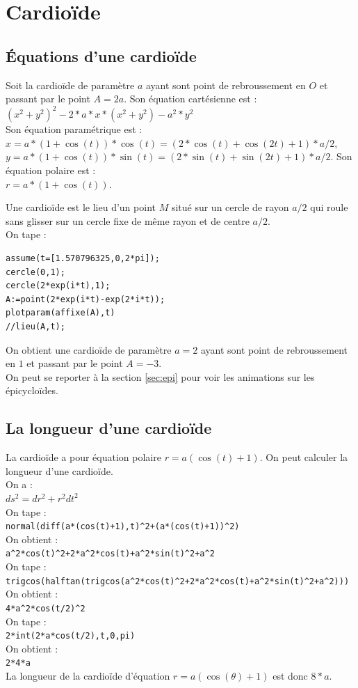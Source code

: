 \documentclass[a4paper,11pt]{book}
\begin{document}
\section{Cardio\"ide}
\subsection{\'Equations d'une cardio\"{i}de}
Soit la cardio\"ide de param\`etre $a$ ayant sont point de rebroussement en $O$ 
et passant par le point $A=2a$.
Son \'equation cart\'esienne est :\\
$(x^2+y^2)^2-2*a*x*(x^2+y^2)-a^2*y^2$\\
Son \'equation param\'etrique est :\\
$x=a*(1+\cos(t))*\cos(t)=(2*\cos(t)+\cos(2t)+1)*a/2$,\\
$y=a*(1+\cos(t))*\sin(t)=(2*\sin(t)+\sin(2t)+1)*a/2$.
Son \'equation polaire est :\\
$r=a*(1+\cos(t))$.

Une cardio\"ide est le lieu d'un point $M$ situ\'e sur un cercle de rayon 
$a/2$ qui roule sans glisser sur un 
cercle fixe de m\^eme rayon et de centre $a/2$.\\
On tape :
\begin{verbatim}
assume(t=[1.570796325,0,2*pi]);
cercle(0,1);
cercle(2*exp(i*t),1);
A:=point(2*exp(i*t)-exp(2*i*t));
plotparam(affixe(A),t)
//lieu(A,t);
\end{verbatim}
On obtient une cardio\"ide de param\`etre $a=2$ ayant sont point de rebroussement
en $1$ et passant par le point $A=-3$.\\
On peut se reporter \`a la section \ref{sec:epi} pour voir les animations sur 
les \'epicyclo\"ides.
\subsection{La longueur d'une cardio\"{i}de}
La cardio\"{i}de a pour \'equation polaire $r=a(\cos(t)+1)$.
On peut calculer la longueur d'une cardio\"{i}de. \\
On a :\\
$ds^2=dr^2+r^2dt^2$\\
On tape :\\
{\tt normal(diff(a*(cos(t)+1),t)\verb|^|2+(a*(cos(t)+1))\verb|^|2)} \\
On obtient :\\
{\tt a\verb|^|2*cos(t)\verb|^|2+2*a\verb|^|2*cos(t)+a\verb|^|2*sin(t)\verb|^|2+a\verb|^|2}\\
On tape :\\
{\tt  trigcos(halftan(trigcos(a\verb|^|2*cos(t)\verb|^|2+2*a\verb|^|2*cos(t)+a\verb|^|2*sin(t)\verb|^|2+a\verb|^|2)))}\\
On obtient :\\
{\tt 4*a\verb|^|2*cos(t/2)\verb|^|2 }\\
On tape :\\
{\tt  2*int(2*a*cos(t/2),t,0,pi)}\\
On obtient :\\
{\tt 2*4*a}\\
La longueur de la cardio\"{i}de d'\'equation $r=a(\cos(\theta)+1)$ est donc 
$8*a$.
\end{document}
